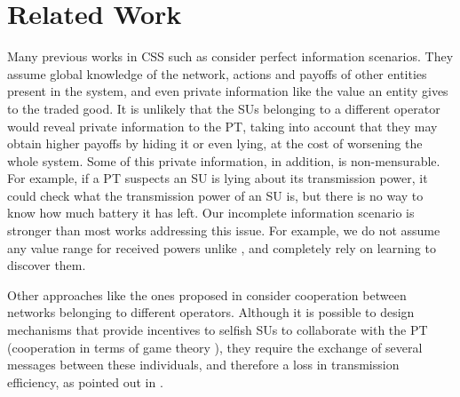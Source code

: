 
\section{Related Work}\label{sec:Rel}
Many previous works in CSS such as \cite{ref:Simeone2008,ref:Zhang2009,ref:Yi2010,ref:Nadkar2011} consider perfect information scenarios. 
They assume global knowledge of the network, actions and payoffs of other entities present in the system, and even private information like the value an entity gives to the traded good.
It is unlikely that the SUs belonging to a different operator would reveal private information to the PT, taking into account that they may obtain higher payoffs by hiding it or even lying, at the cost of worsening the whole system. 
Some of this private information, in addition, is non-mensurable. For example, if a PT suspects an SU is lying about its transmission power, it could check what the transmission power of an SU is, but there is no way to know how much battery it has left. 
Our incomplete information scenario is stronger than most works addressing this issue. 
For example, we do not assume any value range for received powers unlike \cite{ref:Feng2014}, and completely rely on learning to discover them. 

Other approaches like the ones proposed in \cite{ref:Yuan2013,ref:Han2010,ref:Li2011} consider cooperation between networks belonging to different operators. 
Although it is possible to design mechanisms that provide incentives to selfish SUs to collaborate with the PT (cooperation in terms of game theory \cite{ref:Zhang2012_Fair}), they require the exchange of several messages between these individuals, and therefore a loss in transmission efficiency, as pointed out in \cite{ref:Niyato2008}.

